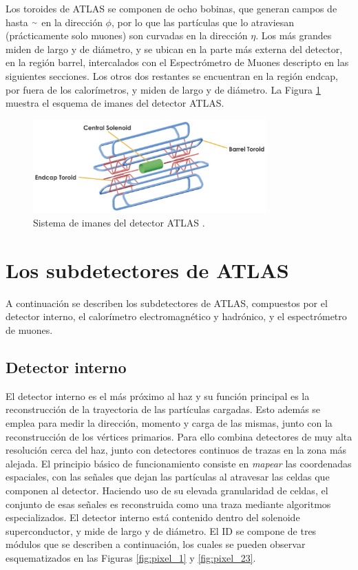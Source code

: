 Los toroides de ATLAS se componen de ocho bobinas, que generan campos de hasta {$\smallsim$} en la dirección $\phi$, por lo que las partículas que lo atraviesan (prácticamente solo muones) son curvadas en la dirección $\eta$. Los más grandes miden  de largo y  de diámetro, y se ubican en la parte más externa del detector, en la región barrel, intercalados con el Espectrómetro de Muones descripto en las siguientes secciones. Los otros dos restantes se encuentran en la región endcap, por fuera de los calorímetros, y miden  de largo y  de diámetro. La Figura \ref{fig:magnet_1} muestra el esquema de imanes del detector ATLAS.

\begin{figure}
\centering
  \includegraphics[width=0.8\textwidth]{images/lhc/magnet_1.png}
  \caption{Sistema de imanes del detector ATLAS \cite{magnet_system}.}
  \label{fig:magnet_1}
\end{figure}


\section{Los subdetectores de ATLAS}

A continuación se describen los subdetectores de ATLAS, compuestos por el detector interno, el calorímetro electromagnético y hadrónico, y el espectrómetro de muones.

\subsection{Detector interno}

El detector interno es el más próximo al haz y su función principal es la reconstrucción de la trayectoria de las partículas cargadas. Esto además se emplea para medir la dirección, momento y carga de las mismas, junto con la reconstrucción de los vértices primarios. Para ello combina detectores de muy alta resolución cerca del haz, junto con detectores continuos de trazas en la zona más alejada. 
El principio básico de funcionamiento consiste en \textit{mapear} las coordenadas espaciales, con las señales que dejan las partículas al atravesar las celdas que componen al detector. 
Haciendo uso de su elevada granularidad de celdas, el conjunto de esas señales es reconstruida como una traza mediante algoritmos especializados. 
El detector interno está contenido dentro del solenoide superconductor, y mide  de largo y  de diámetro. El ID se compone de tres módulos que se describen a continuación, los cuales se pueden observar esquematizados en las Figuras \ref{fig:pixel_1} y \ref{fig:pixel_23}.

